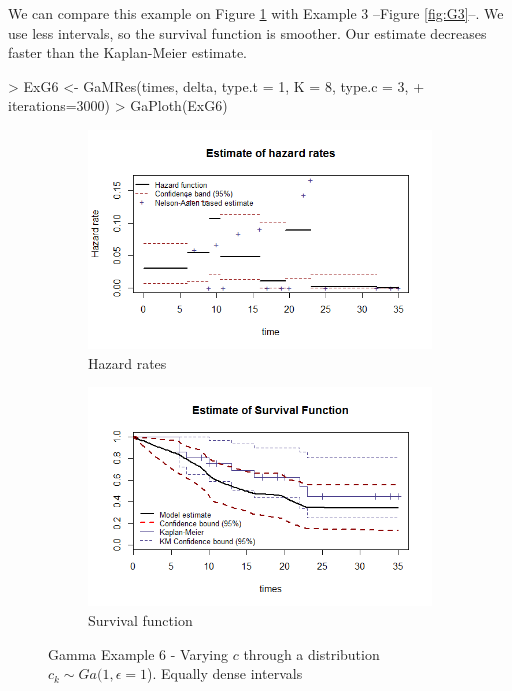 \documentclass[letterpaper]{article}
\begin{document}
We can compare this example on Figure \ref{fig:G6} with Example 3 --Figure \ref{fig:G3}--. We use less intervals, so the survival function is smoother. Our estimate decreases faster than the Kaplan-Meier estimate. 

\begin{Schunk}
\begin{Sinput}
> ExG6 <- GaMRes(times, delta, type.t = 1, K = 8, type.c = 3,
+                iterations=3000)
> GaPloth(ExG6)
\end{Sinput}
\end{Schunk}

\begin{figure}
  \centering
  \begin{subfigure}[a]{\textwidth}\centering
    \includegraphics[width=\textwidth]{G61.png}
    \caption{Hazard rates}
  \end{subfigure}
  \begin{subfigure}[b]{\textwidth}\centering
    \includegraphics[width=\textwidth]{G62.png}
    \caption{Survival function}
  \end{subfigure}
  \caption{Gamma Example 6 - Varying $c$ through a distribution $c_k\sim Ga(1,\epsilon = 1$). Equally dense intervals}
  \label{fig:G6}
\end{figure}
\end{document}
